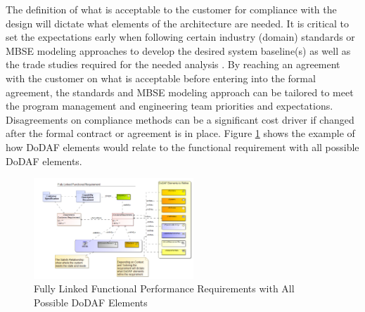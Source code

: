 \documentclass[num-refs]{wiley-article}
\begin{document}
The definition of what is acceptable to the customer for compliance with the design will dictate what elements of the architecture are needed. It is critical to set the expectations early when following certain industry (domain) standards or MBSE modeling approaches to develop the desired system baseline(s) as well as the trade studies required for the needed analysis \cite{StarnellPeter1991}. By reaching an agreement with the customer on what is acceptable before entering into the formal agreement, the standards and MBSE modeling approach can be tailored to meet the program management and engineering team priorities and expectations. Disagreements on compliance methods can be a significant cost driver if changed after the formal contract or agreement is in place. Figure \ref{fig5} shows the example of how DoDAF elements would relate to the functional requirement with all possible DoDAF elements.

\begin{figure}
\centering
\includegraphics[width=6cm]{Images/Capture2.png}
\caption{Fully Linked Functional Performance Requirements with All Possible DoDAF Elements}
\label{fig5}
\end{figure}
\end{document}
